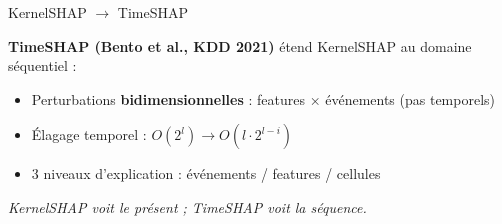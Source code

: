 \documentclass[10pt]{beamer}
\begin{document}
\begin{frame}{KernelSHAP $\to$ TimeSHAP}
  \begin{plusbox}
    \textbf{TimeSHAP (Bento et al., KDD 2021)} étend KernelSHAP au domaine séquentiel :
    \begin{itemize}
      \item Perturbations \textbf{bidimensionnelles} : features × événements (pas temporels)
      \item Élagage temporel : $O(2^l) \to O(l \cdot 2^{l-i})$
      \item 3 niveaux d'explication : événements / features / cellules
    \end{itemize}
    \vspace{2pt}
    \centering
    \emph{KernelSHAP voit le présent ; TimeSHAP voit la séquence.}
  \end{plusbox}
\end{frame}
\end{document}
